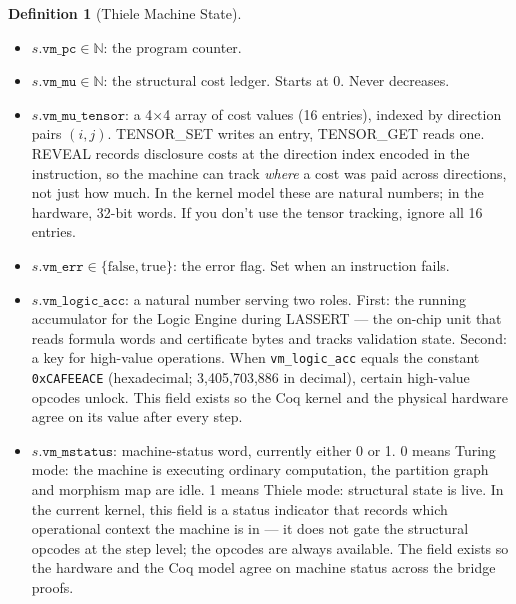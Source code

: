 \documentclass[11pt,a4paper]{article}
\theoremstyle{plain}
\theoremstyle{definition}
\newtheorem{definition}{Definition}[section]
\theoremstyle{remark}
\begin{document}
\begin{definition}[Thiele Machine State]
\begin{itemize}
\item $s.\texttt{vm\_pc} \in \mathbb{N}$: the program counter.
\item $s.\texttt{vm\_mu} \in \mathbb{N}$: the structural cost ledger. Starts at 0. Never decreases.
\item $s.\texttt{vm\_mu\_tensor}$: a 4$\times$4 array of cost values (16 entries), indexed by direction pairs $(i,j)$. TENSOR\_SET writes an entry, TENSOR\_GET reads one. REVEAL records disclosure costs at the direction index encoded in the instruction, so the machine can track \emph{where} a cost was paid across directions, not just how much. In the kernel model these are natural numbers; in the hardware, 32-bit words. If you don't use the tensor tracking, ignore all 16 entries.
\item $s.\texttt{vm\_err} \in \{\text{false}, \text{true}\}$: the error flag. Set when an instruction fails.
\item $s.\texttt{vm\_logic\_acc}$: a natural number serving two roles. First: the running accumulator for the Logic Engine during LASSERT — the on-chip unit that reads formula words and certificate bytes and tracks validation state. Second: a key for high-value operations. When \texttt{vm\_logic\_acc} equals the constant \texttt{0xCAFEEACE} (hexadecimal; 3,405,703,886 in decimal), certain high-value opcodes unlock. This field exists so the Coq kernel and the physical hardware agree on its value after every step.
\item $s.\texttt{vm\_mstatus}$: machine-status word, currently either 0 or 1. 0 means Turing mode: the machine is executing ordinary computation, the partition graph and morphism map are idle. 1 means Thiele mode: structural state is live. In the current kernel, this field is a status indicator that records which operational context the machine is in --- it does not gate the structural opcodes at the step level; the opcodes are always available. The field exists so the hardware and the Coq model agree on machine status across the bridge proofs.

\end{itemize}
\end{definition}
\end{document}
